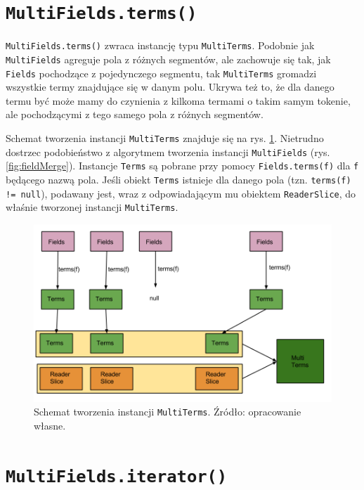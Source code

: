 \section{\texttt{MultiFields.terms()}}

\texttt{MultiFields.terms()} zwraca instancję typu \texttt{MultiTerms}. Podobnie jak \texttt{MultiFields} agreguje pola z różnych segmentów, ale zachowuje się tak, jak \texttt{Fields} pochodzące z pojedynczego segmentu, tak \texttt{MultiTerms}  gromadzi wszystkie termy znajdujące się w danym polu. Ukrywa też to, że dla danego termu być może mamy do czynienia z kilkoma termami o takim samym tokenie, ale pochodzącymi z tego samego pola z różnych segmentów.

Schemat tworzenia instancji \texttt{MultiTerms} znajduje się na rys. \ref{fig:multiTerms}. Nietrudno dostrzec podobieństwo z algorytmem tworzenia instancji \texttt{MultiFields} (rys. \ref{fig:fieldMerge}). Instancje \texttt{Terms} są pobrane przy pomocy \texttt{Fields.terms(f)} dla \texttt{f} będącego nazwą pola. Jeśli obiekt \texttt{Terms} istnieje dla danego pola (tzn. \texttt{terms(f) != null}), podawany jest, wraz z odpowiadającym mu obiektem \texttt{ReaderSlice}, do właśnie tworzonej instancji \texttt{MultiTerms}.

\begin{figure}[here]
 \centering
 \includegraphics[scale=0.4]{pictures/MultiTerms.png}
 \caption{Schemat tworzenia instancji \texttt{MultiTerms}. Źródło: opracowanie własne. \label{fig:multiTerms}}
\end{figure}

\section{\texttt{MultiFields.iterator()}}

